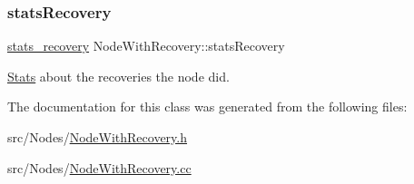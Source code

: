 \subsubsection{\texorpdfstring{stats\+Recovery}{statsRecovery}}
{\footnotesize\ttfamily \hyperlink{_node_with_recovery_8h_a8724f9aa35500c4029d1757428ade746}{stats\+\_\+recovery} Node\+With\+Recovery\+::stats\+Recovery\hspace{0.3cm}{\ttfamily [protected]}}



\hyperlink{class_stats}{Stats} about the recoveries the node did. 



The documentation for this class was generated from the following files\+:\begin{DoxyCompactItemize}
\item 
src/\+Nodes/\hyperlink{_node_with_recovery_8h}{Node\+With\+Recovery.\+h}\item 
src/\+Nodes/\hyperlink{_node_with_recovery_8cc}{Node\+With\+Recovery.\+cc}\end{DoxyCompactItemize}
